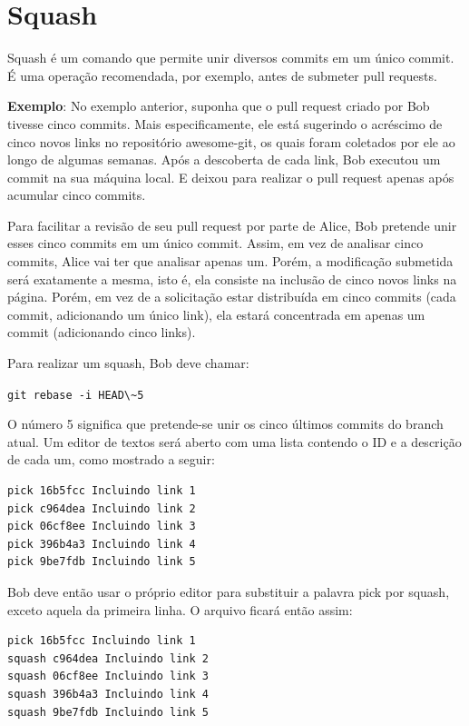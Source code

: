 \documentclass[
  11pt,
  twoside]{book}
\newcommand{\passthrough}[1]{#1}
\begin{document}
\hypertarget{squash}{%
\section{Squash}\label{squash}}


Squash é um comando que permite unir diversos commits em um único
commit. É uma operação recomendada, por exemplo, antes de submeter pull
requests.

\textbf{Exemplo}: No exemplo anterior, suponha que o pull request criado
por Bob tivesse cinco commits. Mais especificamente, ele está sugerindo
o acréscimo de cinco novos links no repositório awesome-git, os quais
foram coletados por ele ao longo de algumas semanas. Após a descoberta
de cada link, Bob executou um commit na sua máquina local. E deixou para
realizar o pull request apenas após acumular cinco commits.

Para facilitar a revisão de seu pull request por parte de Alice, Bob
pretende unir esses cinco commits em um único commit. Assim, em vez de
analisar cinco commits, Alice vai ter que analisar apenas um. Porém, a
modificação submetida será exatamente a mesma, isto é, ela consiste na
inclusão de cinco novos links na página. Porém, em vez de a solicitação
estar distribuída em cinco commits (cada commit, adicionando um único
link), ela estará concentrada em apenas um commit (adicionando cinco
links).

Para realizar um squash, Bob deve chamar:

\passthrough{\lstinline!git rebase -i HEAD\~5!}

O número 5 significa que pretende-se unir os cinco últimos commits do
branch atual. Um editor de textos será aberto com uma lista contendo o
ID e a descrição de cada um, como mostrado a seguir:

\begin{lstlisting}
pick 16b5fcc Incluindo link 1
pick c964dea Incluindo link 2
pick 06cf8ee Incluindo link 3
pick 396b4a3 Incluindo link 4
pick 9be7fdb Incluindo link 5
\end{lstlisting}

Bob deve então usar o próprio editor para substituir a palavra pick por
squash, exceto aquela da primeira linha. O arquivo ficará então assim:

\begin{lstlisting}
pick 16b5fcc Incluindo link 1
squash c964dea Incluindo link 2
squash 06cf8ee Incluindo link 3
squash 396b4a3 Incluindo link 4
squash 9be7fdb Incluindo link 5
\end{lstlisting}
\end{document}
